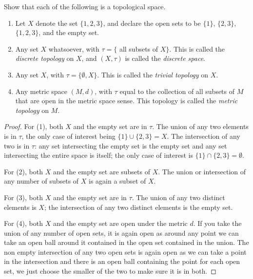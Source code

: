 \begin{exercise}
\label{tm-exercise-2-1}

Show that each of the following is a topological space.

\begin{enumerate}
\item Let $X$ denote the set $\{1, 2, 3\}$, and declare the open sets to be
$\{1\}$, $\{2, 3\}$, $\{1, 2, 3\}$, and the empty set.
\item Any set $X$ whatsoever, with $\tau = \{$ all subsets of $X\}$. This is
called the {\it discrete topology} on $X$, and $(X, \tau)$ is called the
{\it discrete space}.
\item Any set $X$, with $\tau = \{\emptyset, X\}$. This is called the {\it
trivial topology} on $X$.
\item Any metric space $(M, d)$, with $\tau$ equal to the collection of all
subsets of $M$ that are open in the metric space sense. This topology is called
the {\it metric topology} on $M$.
\end{enumerate}

\begin{proof}

For (1), both $X$ and the empty set are in $\tau$.
The union of any two elements is in $\tau$, the only case of interest being
$\{1\} \cup \{2, 3\} = X$. The intersection of any two is in $\tau$: any set
intersecting the empty set is the empty set and any set intersecting the entire
space is itself; the only case of interest is $\{1\} \cap \{2, 3\} = \emptyset$.

For (2), both $X$ and the empty set are subsets of $X$.
The union or intersection of any number of subsets of $X$ is again a subset of
$X$.

For (3), both $X$ and the empty set are in $\tau$.
The union of any two distinct elements is $X$; the intersection of any two
distinct elements is the empty set.

For (4), both $X$ and the empty set are open under the
metric $d$. If you take the union of any number of open sets, it is again open
as around any point we can take an open ball around it contained in the open
set contained in the union. The non empty intersection of any two open sets is
again open as we can take a point in the intersection and there is an open
ball containing the point for each open set, we just choose the smaller of the
two to make sure it is in both.

\end{proof}

\end{exercise}







